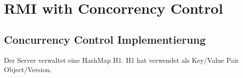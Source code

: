 \chapter{RMI with Concorrency Control}

\section{Concurrency Control Implementierung }
\label{sec:conc-contr-impl}

Der Server verwaltet eine HashMap H1. H1 hat verwendet als Key/Value Pair Object/Version. 



